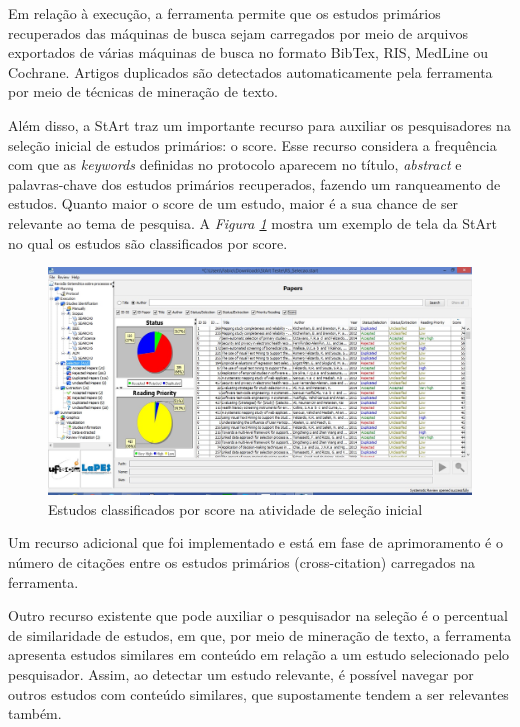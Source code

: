 \begin{enumerate}
    Em relação à execução, a ferramenta permite que os estudos primários recuperados das máquinas de busca sejam carregados por meio de arquivos exportados de várias máquinas de busca no formato BibTex, RIS, MedLine ou Cochrane. Artigos duplicados são detectados automaticamente pela ferramenta por meio de técnicas de mineração de texto.
    
    Além disso, a StArt traz um importante recurso para auxiliar os pesquisadores na seleção inicial de estudos primários: o score. Esse recurso considera a frequência com que as \textit{keywords} definidas no protocolo aparecem no título, \textit{abstract} e palavras-chave dos estudos primários recuperados, fazendo um ranqueamento de estudos. Quanto maior o score de um estudo, maior é a sua chance de ser relevante ao tema de pesquisa. A \textit{Figura \ref{Start02}} mostra um exemplo de tela da StArt no qual os estudos são classificados por score.
    
    \begin{figure}[!htb]
	\centering
	\includegraphics[scale=0.45]{Capitulo-Apendices/figura/Start02.jpg}
	\caption{Estudos classificados por score na atividade de seleção inicial}
	\label{Start02}
    \end{figure}
    
    Um recurso adicional que foi implementado e está em fase de aprimoramento é o número de citações entre os estudos primários (cross-citation) carregados na ferramenta. 
    
    Outro recurso existente que pode auxiliar o pesquisador na seleção é o percentual de similaridade de estudos, em que, por meio de mineração de texto, a ferramenta apresenta estudos similares em conteúdo em relação a um estudo selecionado pelo pesquisador. Assim, ao detectar um estudo relevante, é possível navegar por outros estudos com conteúdo similares, que supostamente tendem a ser relevantes também.


\end{enumerate}
